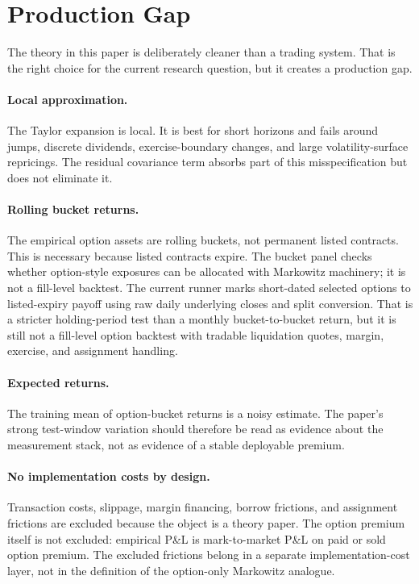 \section{Production Gap}

The theory in this paper is deliberately cleaner than a trading system. That is the right
choice for the current research question, but it creates a production gap.

\paragraph{Local approximation.}
The Taylor expansion is local. It is best for short horizons and fails around jumps,
discrete dividends, exercise-boundary changes, and large volatility-surface repricings.
The residual covariance term absorbs part of this misspecification but does not eliminate
it.

\paragraph{Rolling bucket returns.}
The empirical option assets are rolling buckets, not permanent listed contracts. This is
necessary because listed contracts expire. The bucket panel checks whether option-style
exposures can be allocated with Markowitz machinery; it is not a fill-level backtest. The
current runner marks short-dated selected options to listed-expiry payoff using raw daily
underlying closes and split conversion. That is a stricter holding-period test than a
monthly bucket-to-bucket return, but it is still not a fill-level option backtest with
tradable liquidation quotes, margin, exercise, and assignment handling.

\paragraph{Expected returns.}
The training mean of option-bucket returns is a noisy estimate. The paper's strong
test-window variation should therefore be read as evidence about the measurement stack,
not as evidence of a stable deployable premium.

\paragraph{No implementation costs by design.}
Transaction costs, slippage, margin financing, borrow frictions, and assignment frictions
are excluded because the object is a theory paper. The option premium itself is not
excluded: empirical P\&L is mark-to-market P\&L on paid or sold option premium. The
excluded frictions belong in a separate implementation-cost layer, not in the definition
of the option-only Markowitz analogue.


